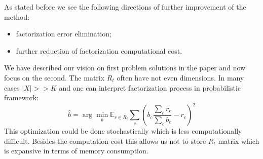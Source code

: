 \documentclass{article}
\begin{document}
As stated before we see the following directions of further improvement of the method:
\begin{itemize}
	\item factorization error elimination;
	\item further reduction of factorization computational cost.
\end{itemize}
We have described our vision on first problem solutions in the paper and now focus on the second. The matrix $R_t$ often have not even dimensions. In many cases $|X| >> K$ and one can interpret factorization process in probabilistic framework:
$$
\hat{b} = \arg \min_b \mathbb{E}_{r \in R_t}\sum_c\left(b_c \frac{\sum_c r_c}{\sum_c b_c} - r_c\right)^2
$$
This optimization could be done stochastically which is less computationally difficult. Besides the computation cost this allows us not to store $R_t$ matrix which is expansive in terms of memory consumption.
\end{document}
